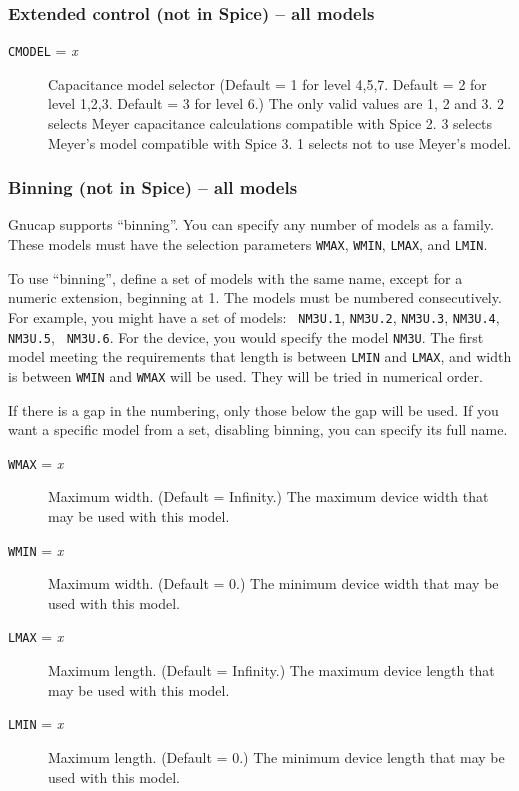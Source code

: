 \subsubsection{Extended control (not in Spice) -- all models}
\begin{description}

\item[{\tt CMODEL} = {\it x}]
Capacitance model selector (Default = 1 for level 4,5,7.  Default = 2
for level 1,2,3.  Default = 3 for level 6.)  The only valid values are
1, 2 and 3.  2 selects Meyer capacitance calculations compatible with
Spice 2.  3 selects Meyer's model compatible with Spice 3.  1 selects
not to use Meyer's model.

\end{description}
\subsubsection{Binning (not in Spice) -- all models}

Gnucap supports ``binning''.  You can specify any number of models as
a family.  These models must have the selection parameters {\tt WMAX},
{\tt WMIN}, {\tt LMAX}, and {\tt LMIN}.

To use ``binning'', define a set of models with the same name, except
for a numeric extension, beginning at 1.  The models must be numbered
consecutively.  For example, you might have a set of models: {\tt
NM3U.1}, {\tt NM3U.2}, {\tt NM3U.3}, {\tt NM3U.4}, {\tt NM3U.5}, {\tt
NM3U.6}.  For the device, you would specify the model {\tt NM3U}.  The
first model meeting the requirements that length is between {\tt LMIN}
and {\tt LMAX}, and width is between {\tt WMIN} and {\tt WMAX} will be
used.  They will be tried in numerical order.

If there is a gap in the numbering, only those below the gap will be
used.  If you want a specific model from a set, disabling binning, you
can specify its full name.

\begin{description}

\item[{\tt WMAX} = {\it x}]
Maximum width. (Default = Infinity.)  The maximum device width that
may be used with this model.

\item[{\tt WMIN} = {\it x}]
Maximum width. (Default = 0.)  The minimum device width that may be
used with this model.

\item[{\tt LMAX} = {\it x}]
Maximum length. (Default = Infinity.)  The maximum device length that
may be used with this model.

\item[{\tt LMIN} = {\it x}]
Maximum length. (Default = 0.)  The minimum device length that may be
used with this model.

\end{description}
